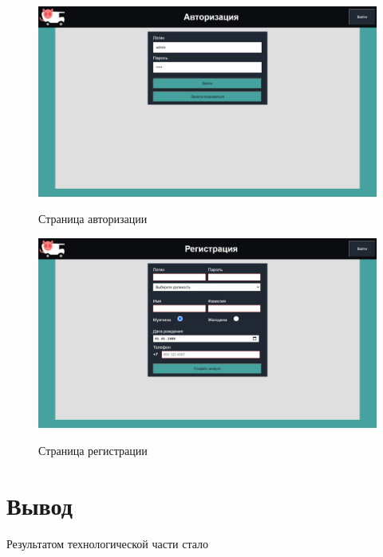 \begin{figure}[h!] \label{login_sc}
	\begin{center}
		{\includegraphics[scale=0.38, angle=0]{sc/login}}
		\caption{Страница авторизации}
	\end{center}
\end{figure}

\begin{figure}[h!] \label{signup_sc}
	\begin{center}
		{\includegraphics[scale=0.38, angle=0]{sc/signup}}
		\caption{Страница регистрации}
	\end{center}
\end{figure}

\section*{Вывод}
Результатом технологической части стало
